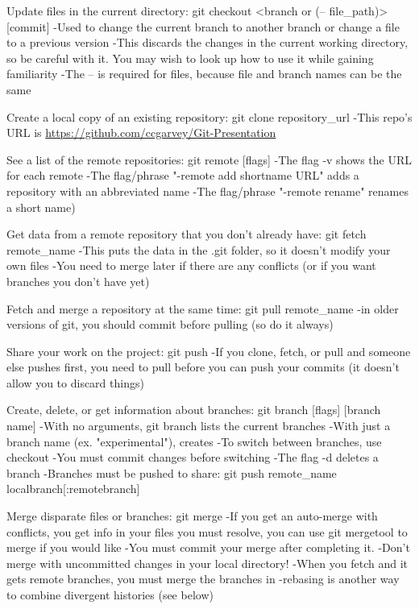 \documentclass[12pt]{article}
\begin{document}
Update files in the current directory:
git checkout <branch or (-- file{\_}path)> [commit]
-Used to change the current branch to another branch or change a file to a
    previous version
-This discards the changes in the current working directory, so be careful
    with it. You may wish to look up how to use it while gaining familiarity
-The -- is required for files, because file and branch names can be the same
    
Create a local copy of an existing repository:
git clone repository{\_}url
-This repo's URL is \url{https://github.com/ccgarvey/Git-Presentation}

See a list of the remote repositories:
git remote [flags]
-The flag -v shows the URL for each remote
-The flag/phrase "-remote add shortname URL" adds a repository with an
    abbreviated name
-The flag/phrase "-remote rename" renames a short name)

Get data from a remote repository that you don't already have:
git fetch remote{\_}name
-This puts the data in the .git folder, so it doesn't modify your own files
-You need to merge later if there are any conflicts (or if you want branches
    you don't have yet)
    
Fetch and merge a repository at the same time:
git pull remote{\_}name
-in older versions of git, you should commit before pulling (so do it always)

Share your work on the project:
git push
-If you clone, fetch, or pull and someone else pushes first, you need to pull
    before you can push your commits (it doesn't allow you to discard things)

Create, delete, or get information about branches:
git branch [flags] [branch name]
-With no arguments, git branch lists the current branches
-With just a branch name (ex. "experimental"), creates
-To switch between branches, use checkout
    -You must commit changes before switching
-The flag -d deletes a branch
-Branches must be pushed to share:
    git push remote{\_}name localbranch[:remotebranch]

Merge disparate files or branches:
git merge
-If you get an auto-merge with conflicts, you get info in your files you
    must resolve, you can use git mergetool to merge if you would like
-You must commit your merge after completing it.
-Don't merge with uncommitted changes in your local directory!
-When you fetch and it gets remote branches, you must merge the branches in
-rebasing is another way to combine divergent histories (see below)
\end{document}
